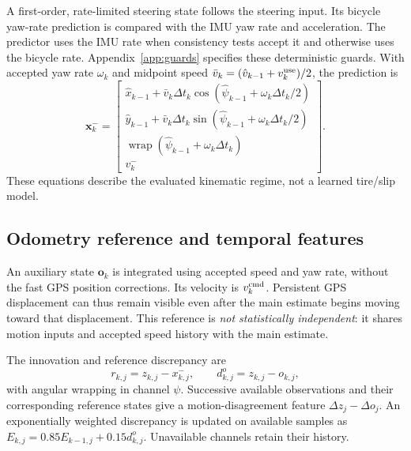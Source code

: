 ﻿\documentclass[10pt,a4paper]{article}
\newcommand{\vx}{\bm{x}}
\newcommand{\wrap}{\operatorname{wrap}}
\begin{document}
A first-order, rate-limited steering state follows the steering input.
Its bicycle yaw-rate prediction is compared with the IMU yaw rate and acceleration.
The predictor uses the IMU rate when consistency tests accept it and otherwise uses
the bicycle rate. Appendix~\ref{app:guards} specifies these deterministic guards.
With accepted yaw rate $\omega_k$ and midpoint speed
$\bar v_k=(\hat v_{k-1}+v_k^{\rm use})/2$, the prediction is
\begin{equation}
 \vx_k^-=
 \begin{bmatrix}
 \hat x_{k-1}+\bar v_k\Delta t_k\cos(\hat\psi_{k-1}+\omega_k\Delta t_k/2)\\
 \hat y_{k-1}+\bar v_k\Delta t_k\sin(\hat\psi_{k-1}+\omega_k\Delta t_k/2)\\
 \wrap(\hat\psi_{k-1}+\omega_k\Delta t_k)\\
 v_k^-
 \end{bmatrix}.
 \label{eq:prediction}
\end{equation}
These equations describe the evaluated kinematic regime, not a learned tire/slip model.

\subsection{Odometry reference and temporal features}
An auxiliary state $\bm{o}_k$ is integrated using accepted speed and yaw rate,
without the fast GPS position corrections. Its velocity is $v_k^{\rm cmd}$.
Persistent GPS displacement can thus remain visible even after the main estimate begins
moving toward that displacement. This reference is \emph{not statistically independent}:
it shares motion inputs and accepted speed history with the main estimate.

The innovation and reference discrepancy are
\begin{equation}
 r_{k,j}=z_{k,j}-x_{k,j}^-,\qquad d^o_{k,j}=z_{k,j}-o_{k,j},
 \label{eq:residuals}
\end{equation}
with angular wrapping in channel $\psi$.
Successive available observations and their corresponding reference states give
a motion-disagreement feature $\Delta z_j-\Delta o_j$.
An exponentially weighted discrepancy is updated on available samples as
$E_{k,j}=0.85E_{k-1,j}+0.15d^o_{k,j}$.
Unavailable channels retain their history.
\end{document}

